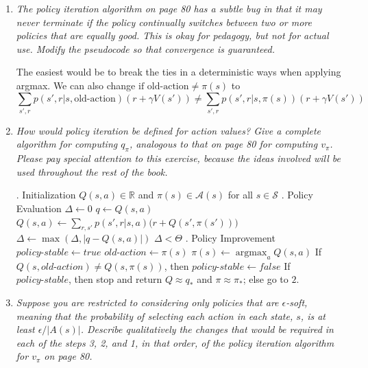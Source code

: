 \documentclass[12pt,a4paper]{article}
\DeclareMathOperator*{\argmax}{argmax}
\begin{document}
\begin{enumerate}
  \item
    \textit{The policy iteration algorithm on page 80 has a subtle bug in that it may
    never terminate if the policy continually switches between two or more policies that are
    equally good. This is okay for pedagogy, but not for actual use. Modify the pseudocode
    so that convergence is guaranteed.}

    The easiest would be to break the ties in a deterministic ways when applying argmax.
    We can also change $\text{if old-action} \neq \pi(s)$ to
    \[
    \sum\limits_{s', r} p(s', r | s, \text{old-action}) (r + \gamma V(s')) \neq
    \sum\limits_{s', r} p(s', r | s, \pi(s)) (r + \gamma V(s'))
    \]

  \item
    \textit{How would policy iteration be defined for action values? Give a complete
    algorithm for computing $q_\pi$, analogous to that on page 80 for computing $v_\pi$. Please pay
    special attention to this exercise, because the ideas involved will be used throughout the
    rest of the book.}

    \begin{algorithmic}
      . Initialization
      \STATE $Q(s, a) \in \mathbb{R}$ and $\pi(s) \in \mathcal{A}(s)$ for all $s \in \mathcal{S}$
      \STATE
      . Policy Evaluation
      \REPEAT
      \STATE $\Delta \leftarrow 0$
      \STATE $q \leftarrow Q(s, a)$
      \STATE $Q(s, a) \leftarrow \sum\limits_{r, s'} p(s', r | s, a) \Big(r + Q(s', \pi(s'))\Big)$
      \STATE $\Delta \leftarrow \max(\Delta, |q - Q(s, a)|)$
      \ENDFOR
      \ENDFOR
      \UNTIL $\Delta < \Theta$
      \STATE
      . Policy Improvement
      \STATE $\textit{policy-stable} \leftarrow true$
      \STATE $\textit{old-action} \leftarrow \pi(s)$
      \STATE $\pi(s) \leftarrow \argmax_a Q(s, a)$
      \STATE If $Q(s, \textit{old-action}) \neq Q(s, \pi(s))$, then $\textit{policy-stable} \leftarrow false$
      \ENDFOR
      \STATE If $\textit{policy-stable}$, then stop and return $Q \approx q_\ast$ and
      $\pi \approx \pi_\ast$; else go to $2$.
    \end{algorithmic}

  \item
    \textit{Suppose you are restricted to considering only policies that are $\epsilon$-soft,
    meaning that the probability of selecting each action in each state, $s$, is at least $\epsilon/|A(s)|$.
    Describe qualitatively the changes that would be required in each of the steps 3, 2, and 1,
    in that order, of the policy iteration algorithm for $v_\pi$ on page 80.}


\end{enumerate}
\end{document}
